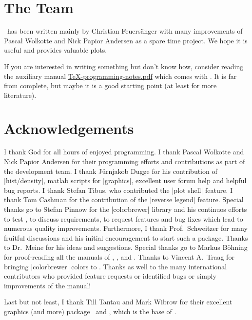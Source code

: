 \section{The Team}
\PGFPlots\ has been written mainly by Christian Feuersänger with many improvements of Pascal Wolkotte and Nick Papior Andersen as a spare time project. We hope it is useful and provides valuable plots.

If you are interested in writing something but don't know how, consider reading the auxiliary manual \href{file:TeX-programming-notes.pdf}{TeX-programming-notes.pdf} which comes with \PGFPlots. It is far from complete, but maybe it is a good starting point (at least for more literature).

\section{Acknowledgements}
I thank God for all hours of enjoyed programming. I thank Pascal Wolkotte and Nick Papior Andersen for their programming efforts and contributions as part of the development team. I thank J\"urnjakob Dugge for his contribution of |hist/density|, matlab scripts for  |graphics|, excellent user forum help and helpful bug reports. I thank Stefan Tibus, who contributed the |plot shell| feature. I thank Tom Cashman for the contribution of the |reverse legend| feature. Special thanks go to Stefan Pinnow for the |colorbrewer| library and his continuos efforts to test \PGFPlots, to discuss requirements, to request features and bug fixes which lead to numerous quality improvements. Furthermore, I thank Prof.~Schweitzer for many fruitful discussions and his initial encouragement to start such a package. Thanks to Dr.~Meine for his ideas and suggestions. Special thanks go to Markus B\"ohning for proof-reading all the manuals of \PGF, \PGFPlots, and \PGFPlotstable. Thanks to Vincent A.\ Traag for bringing |colorbrewer| colors to \Tikz. Thanks as well to the many international contributors who provided feature requests or identified bugs or simply improvements of the manual!

Last but not least, I thank Till Tantau and Mark Wibrow for their excellent graphics (and more) package \PGF\ and \Tikz, which is the base of \PGFPlots.



